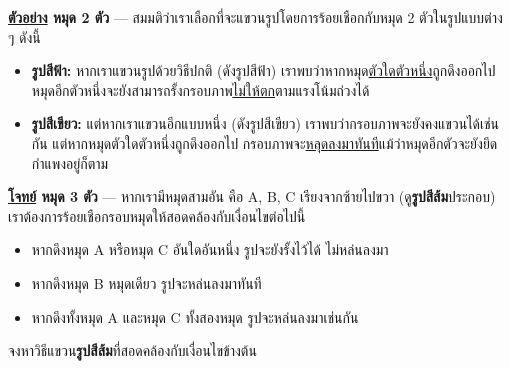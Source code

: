 \medskip\noindent
\textbf{\uline{ตัวอย่าง}\; หมุด 2 ตัว} ---
สมมติว่าเราเลือกที่จะแขวนรูปโดยการร้อยเชือกกับหมุด 2 ตัวในรูปแบบต่าง ๆ ดังนี้
\begin{itemize}[before*=\small]
\item \textbf{รูปสีฟ้า:} หากเราแขวนรูปด้วยวิธีปกติ (ดังรูปสีฟ้า) เราพบว่าหากหมุด\uline{ตัวใดตัวหนึ่ง}ถูกดึงออกไป 
    หมุดอีกตัวหนึ่งจะยังสามารถรั้งกรอบภาพ\uline{ไม่ให้ตก}ตามแรงโน้มถ่วงได้
\item \textbf{รูปสีเขียว:} แต่หากเราแขวนอีกแบบหนึ่ง (ดังรูปสีเขียว) เราพบว่ากรอบภาพจะยังคงแขวนได้เช่นกัน
    แต่หากหมุดตัวใดตัวหนึ่งถูกดึงออกไป กรอบภาพจะ\uline{หลุดลงมาทันที}แม้ว่าหมุดอีกตัวจะยังยึดกำแพงอยู่ก็ตาม
\end{itemize}

\noindent
\textbf{\uline{โจทย์}\; หมุด 3 ตัว} ---
หากเรามีหมุดสามอัน คือ A, B, C เรียงจากซ้ายไปขวา (ดู\textbf{รูปสีส้ม}ประกอบ) 
เราต้องการร้อยเชือกรอบหมุดให้สอดคล้องกับเงื่อนไขต่อไปนี้
\begin{itemize}
\item หากดึงหมุด A หรือหมุด C อันใดอันหนึ่ง รูปจะยังรั้งไว้ได้ ไม่หล่นลงมา
\item หากดึงหมุด B หมุดเดียว รูปจะหล่นลงมาทันที
\item หากดึงทั้งหมุด A และหมุด C ทั้งสองหมุด รูปจะหล่นลงมาเช่นกัน
\end{itemize}

\noindent
จงหาวิธีแขวน{\hrsp}\textbf{รูปสีส้ม}{\hrsp}ที่สอดคล้องกับเงื่อนไขข้างต้น\hrsp%

